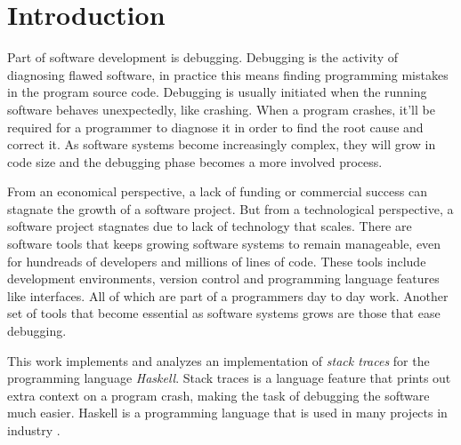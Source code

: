 \chapter{Introduction}

Part of software development is debugging. Debugging is the activity of
diagnosing flawed software, in practice this means finding programming mistakes
in the program source code. Debugging is usually initiated when the running
software behaves unexpectedly, like crashing. When a program crashes, it'll be
required for a programmer to diagnose it in order to find the root cause and
correct it. As software systems become increasingly complex, they will grow in
code size and the debugging phase becomes a more involved process.

From an economical perspective, a lack of funding or commercial success can
stagnate the growth of a software project. But from a technological perspective, a
software project stagnates due to lack of technology that scales. There are
software tools that keeps growing software systems to remain manageable, even for
hundreads of developers and millions of lines of code. These tools include
development environments, version control and programming language features
like interfaces. All of which are part of a programmers day to day work.
Another set of tools that become essential as software systems grows are those
that ease debugging.

This work implements and analyzes an implementation of \emph{stack traces} for
the programming language \emph{Haskell}. Stack traces is a language feature that
prints out extra context on a program crash, making the task of debugging the
software much easier. Haskell is a programming language that is used in many
projects in industry \cite{haskell_in_industry} \cite{fpcomplete_case_studies}.


